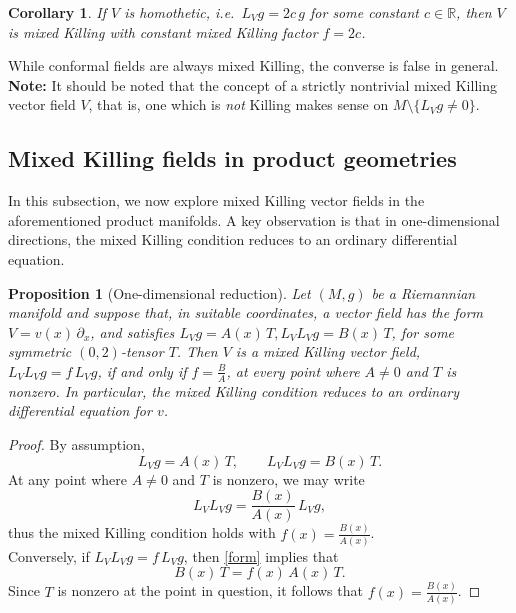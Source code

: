 \documentclass{article}
\newtheorem{proposition}[theorem]{Proposition}
\newtheorem{corollary}{Corollary}[section]
\theoremstyle{definition}
\theoremstyle{remark}
\begin{document}
\begin{corollary}\label{cor:homothetic-mixed-killing}
If $V$ is homothetic, i.e.\ $L_V g = 2c\,g$ for some constant $c\in\mathbb{R}$,
then $V$ is mixed Killing with \emph{constant} mixed Killing factor
$f = 2c$.
\end{corollary}

While conformal fields are always mixed Killing, the converse is false in general.\\

\noindent
{\bf Note:} It should be noted that the concept of a strictly nontrivial mixed Killing vector field $V$, that is, one 
which is {\it not} Killing makes sense on $M \setminus \{ L_{V} g 
\neq 0 \}$. 



\subsection{Mixed Killing fields in  product geometries}\label{sec:MK-Cigar}
  In this subsection, we now explore mixed Killing vector fields in the aforementioned product manifolds. A key observation is that in one-dimensional directions, the mixed Killing condition reduces to an ordinary differential equation.  

\begin{proposition}[One-dimensional reduction]\label{pro:1D-reduction}
Let $(M,g)$ be a Riemannian manifold and suppose that, in suitable
coordinates, a vector field has the form $V = v(x)\,\partial_x$,
and satisfies $L_V g = A(x)\,T,  L_V L_V g = B(x)\, T$,
for some symmetric $(0,2)$-tensor $T$. Then $V$ is a mixed Killing vector
field, $L_V L_V g = f\, L_V g$, if and only if  $f = \frac{B}{A}$,
at every point where $A \neq 0$ and $T$ is nonzero. In particular,
the mixed Killing condition reduces to an ordinary differential equation for $v$.
\end{proposition}

\begin{proof}
By assumption,
\begin{equation}\label{form}
L_V g = A(x)\,T, \qquad L_V L_V g = B(x)\,T.
\end{equation}
At any point where $A \neq 0$ and $T$ is nonzero, we may write
\[
L_V L_V g = \frac{B(x)}{A(x)}\,L_V g,
\]
thus the mixed Killing condition holds with $f(x) =  \frac{B(x)}{A(x)}$.\\
Conversely, if  $L_V L_V g = f\,L_V g$, then \eqref{form}  implies that
\[
B(x)\,T = f(x)\,A(x)\,T.
\]
Since $T$ is nonzero at the point in question, it follows that $f(x) = \frac{B(x)}{A(x)}$.
\end{proof}
\end{document}
